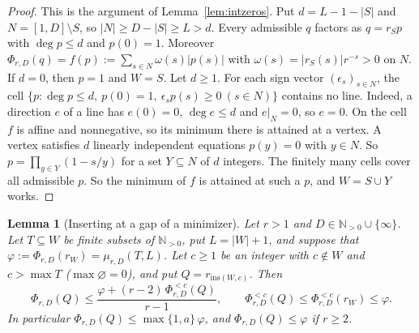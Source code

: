 \documentclass[11pt]{article}
\newtheorem{lemma}[theorem]{Lemma}
\newcommand{\N}{\mathbb N}
\begin{document}
\begin{proof}
This is the argument of Lemma~\ref{lem:intzeros}.  Put $d=L-1-|S|$ and
$N=[1,D]\setminus S$, so $|N|\ge D-|S|\ge L>d$.  Every admissible $q$
factors as $q=r_Sp$ with $\deg p\le d$ and $p(0)=1$.  Moreover
$\Phi_{r,D}(q)=f(p):=\sum_{s\in N}\omega(s)|p(s)|$ with
$\omega(s)=|r_S(s)|r^{-s}>0$ on $N$.  If $d=0$, then $p=1$ and $W=S$.  Let
$d\ge1$.  For each sign vector $(\epsilon_s)_{s\in N}$, the cell
$\{p:\deg p\le d,\ p(0)=1,\ \epsilon_sp(s)\ge0\ (s\in N)\}$ contains no line.
Indeed, a direction $e$ of a line has $e(0)=0$, $\deg e\le d$ and $e|_N=0$,
so $e=0$.  On the cell $f$ is affine and nonnegative, so its minimum there is
attained at a vertex.  A vertex satisfies $d$ linearly independent equations
$p(y)=0$ with $y\in N$.  So $p=\prod_{y\in Y}(1-s/y)$ for a set $Y\subseteq N$
of $d$ integers.  The finitely many cells cover all admissible $p$.  So the
minimum of $f$ is attained at such a $p$, and $W=S\cup Y$ works.
\end{proof}

\begin{lemma}[Inserting at a gap of a minimizer]\label{lem:optins}
Let $r>1$ and $D\in\N_{>0}\cup\{\infty\}$.  Let $T\subseteq W$ be finite
subsets of $\N_{>0}$, put $L=|W|+1$, and suppose that
$\varphi:=\Phi_{r,D}(r_W)=\mu_{r,D}(T,L)$.  Let $c\ge1$ be an integer with
$c\notin W$ and $c>\max T$ ($\max\varnothing=0$), and put
$Q=r_{\mathrm{ins}(W,c)}$.  Then
\[
  \Phi_{r,D}(Q)\le\frac{\varphi+(r-2)\,\Phi_{r,D}^{<c}(Q)}{r-1},
  \qquad
  \Phi_{r,D}^{<c}(Q)\le\Phi_{r,D}^{<c}(r_W)\le\varphi .
\]
In particular $\Phi_{r,D}(Q)\le\max\{1,a\}\,\varphi$, and
$\Phi_{r,D}(Q)\le\varphi$ if $r\ge2$.
\end{lemma}
\end{document}
